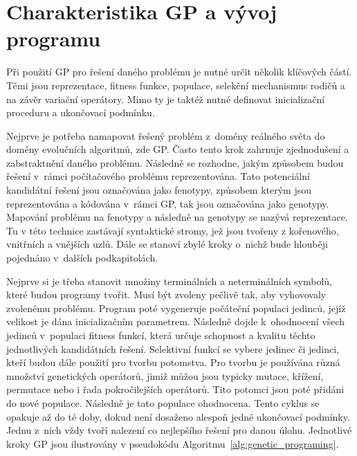 \section{Charakteristika GP a vývoj programu}
Při použití GP pro řešení daného problému je nutné určit několik klíčových částí. Těmi jsou reprezentace, fitness funkce, populace, selekční mechanismus rodičů a na závěr variační operátory. Mimo ty je taktéž nutné definovat inicializační proceduru a ukončovací podmínku.

Nejprve je potřeba namapovat řešený problém z~domény reálného světa do domény evolučních algoritmů, zde GP. Často tento krok zahrnuje zjednodušení a zabstraktnění daného problému. Následně se rozhodne, jakým způsobem budou řešení v~rámci počítačového problému reprezentována. Tato potenciální kandidátní řešení jsou označována jako fenotypy, způsobem kterým jsou reprezentována a kódována v~rámci GP, tak jsou označována jako genotypy. Mapování problému na fenotypy a následně na genotypy se nazývá reprezentace. Tu v této technice zastávají syntaktické stromy, jež jsou tvořeny z kořenového, vnitřních a vnějších uzlů. Dále se stanoví zbylé kroky o~nichž bude hlouběji pojednáno v~dalších podkapitolách. 

Nejprve si je třeba stanovit množiny terminálních a neterminálních symbolů, které budou programy tvořit. Musí být zvoleny pečlivě tak, aby vyhovovaly zvolenému problému. Program poté vygeneruje počáteční populaci jedinců, jejíž velikost je dána inicializačním parametrem. Následně dojde k~ohodnocení všech jedinců v~populaci fitness funkcí, která určuje schopnost a kvalitu těchto jednotlivých kandidátních řešení. Selektivní funkcí se vybere jedinec či jedinci, kteří budou dále použití pro tvorbu potomstva. Pro tvorbu je používána různá množství genetických operátorů, jimiž můžou jsou typicky mutace, křížení, permutace nebo i řada pokročilejších operátorů. Tito potomci jsou poté přidáni do nové populace. Následně je tato populace ohodnocena. Tento cyklus se opakuje až do té doby, dokud není dosaženo alespoň jedné ukončovací podmínky. Jednu z~nich vždy tvoří nalezení co nejlepšího řešení pro danou úlohu. Jednotlivé kroky GP jsou ilustrovány v pseudokódu Algoritmu~\ref{alg:genetic_programing}.\\

